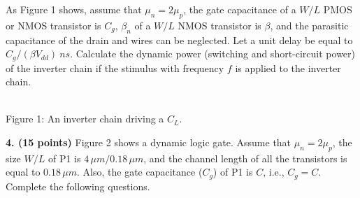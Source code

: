 \documentclass[10pt]{article}
\newcommand{\mos}[4]{\begin{scope}[shift={(#1,#2)}]
\draw(0,.24)--(0,-.24);\draw(0,.2)--(.25,.2)--(.25,.5);\draw(0,-.2)--(.25,-.2)--(.25,-.5);
\draw(-.16,.23)--(-.16,-.23);
\ifnum#4=1\draw(-.26,0)circle(.06);\draw(-.75,0)--(-.32,0);\else\draw(-.75,0)--(-.16,0);\fi
\node[anchor=east,font=\scriptsize]at(-.76,0){$#3$};\end{scope}}
\newcommand{\gnd}[2]{\draw(#1,#2)--(#1,{#2-.12});\draw({#1-.17},{#2-.12})--({#1+.17},{#2-.12});\draw({#1-.11},{#2-.2})--({#1+.11},{#2-.2});}
\newcommand{\rail}[3]{\draw(#1,#2)--(#1,{#2+.14});\node[above,font=\scriptsize]at(#1,{#2+.14}){$#3$};}
\begin{document}
As Figure 1 shows, assume that $\mu_n=2\mu_p$, the gate capacitance of a $W/L$ PMOS or NMOS transistor is $C_g$, $\beta_n$ of a $W/L$ NMOS transistor is $\beta$, and the parasitic capacitance of the drain and wires can be neglected. Let a unit delay be equal to $C_g/(\beta V_{dd})\ ns$. Calculate the dynamic power (switching and short-circuit power) of the inverter chain if the stimulus with frequency $f$ is applied to the inverter chain.\begin{center}\\Figure 1: An inverter chain driving a $C_L$.\end{center}\textbf{4. (15 points)} Figure 2 shows a dynamic logic gate. Assume that $\mu_n=2\mu_p$, the size $W/L$ of P1 is $4\,\mu m/0.18\,\mu m$, and the channel length of all the transistors is equal to $0.18\,\mu m$. Also, the gate capacitance ($C_g$) of P1 is $C$, i.e., $C_g=C$. Complete the following questions.
\end{document}
